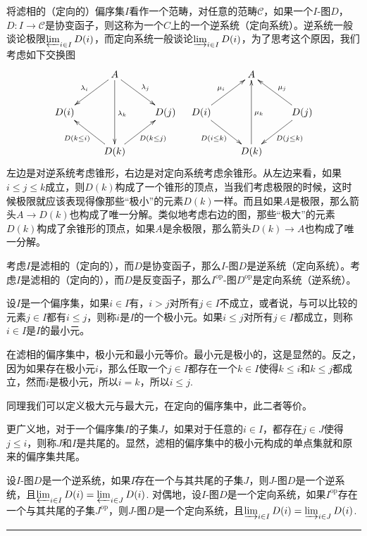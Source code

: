 \para 将滤相的（定向的）偏序集$I$看作一个范畴，对任意的范畴$\mathcal{C}$，如果一个$I$-图$D$，$D:I\to \mathcal{C}$是协变函子，则这称为一个$C$上的一个{逆系统}（{定向系统}）。逆系统一般谈论极限$\varprojlim_{i\in I} D(i)$，而定向系统一般谈论$\varinjlim_{i\in I} D(i)$，为了思考这个原因，我们考虑如下交换图
\[
	\xymatrix{
		&A \ar[dl]_{\lambda_{i}}\ar[dr]^{\lambda_{j}}\ar[dd]^{\lambda_{k}}&\\
		D(i)&&D(j)\\
		&D(k)\ar[ul]^{D(k\leq i)}\ar[ur]_{D(k\leq j)}&
	}
	\quad
	\xymatrix{
		&A &\\
		\ar[ur]^{\mu_{i}}D(i)\ar[dr]_{D(i\leq k)}&&D(j)\ar[ul]_{\mu_{j}}\ar[dl]^{D(j\leq k)}\\
		&D(k)\ar[uu]_{\mu_{k}}&
	}
\]
左边是对逆系统考虑锥形，右边是对定向系统考虑余锥形。从左边来看，如果$i\leq j\leq k$成立，则$D(k)$构成了一个锥形的顶点，当我们考虑极限的时候，这时候极限就应该表现得像那些“极小”的元素$D(k)$一样。而且如果$A$是极限，那么箭头$A\to D(k)$也构成了唯一分解。类似地考虑右边的图，那些“极大”的元素$D(k)$构成了余锥形的顶点，如果$A$是余极限，那么箭头$D(k)\to A$也构成了唯一分解。

\para 考虑$I$是滤相的（定向的），而$D$是协变函子，那么$I$-图$D$是逆系统（定向系统）。考虑$I$是滤相的（定向的），而$D$是反变函子，那么$I^{\mathrm{op}}$-图$D^{\mathrm{op}}$是定向系统（逆系统）。

\para 设$I$是一个偏序集，如果$i\in I$有，$i>j$对所有$j\in I$不成立，或者说，与可以比较的元素$j\in I$都有$i\leq j$，则称$i$是$I$的一个极小元。如果$i\leq j$对所有$j\in I$都成立，则称$i\in I$是$I$的最小元。

在滤相的偏序集中，极小元和最小元等价。最小元是极小的，这是显然的。反之，因为如果存在极小元$i$，那么任取一个$j\in I$都存在一个$k\in I$使得$k\leq i$和$k\leq j$都成立，然而$i$是极小元，所以$i=k$，所以$i\leq j$.

同理我们可以定义极大元与最大元，在定向的偏序集中，此二者等价。

更广义地，对于一个偏序集$I$的子集$J$，如果对于任意的$i\in I$，都存在$j\in J$使得$j\leq i$，则称$J$和$I$是共尾的。显然，滤相的偏序集中的极小元构成的单点集就和原来的偏序集共尾。

\pro 设$I$-图$D$是一个逆系统，如果$I$存在一个与其共尾的子集$J$，则$J$-图$D$是一个逆系统，且$\varprojlim_{i\in I} D(i)=\varprojlim_{i\in J} D(i)$. 对偶地，设$I$-图$D$是一个定向系统，如果$I^{\mathrm{op}} $存在一个与其共尾的子集$J^{\mathrm{op}} $，则$J$-图$D$是一个定向系统，且$\varinjlim_{i\in I} D(i)=\varinjlim_{i\in J} D(i)$. \rule{2mm}{2mm}

